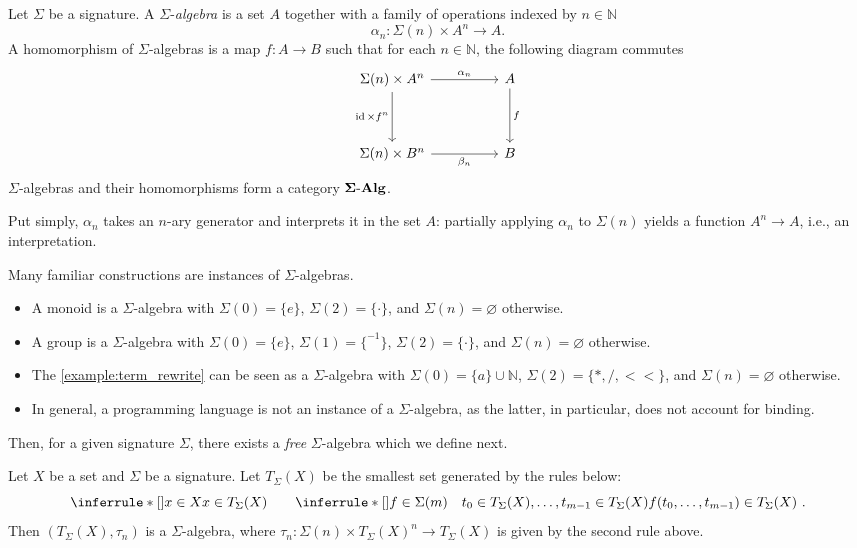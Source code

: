 \begin{definition}\label{def:sigma-alg}
Let $\Sigma$ be a signature.
A $\Sigma$-\emph{algebra} is a set $A$ together with a family of operations indexed by $n \in \mathbb{N}$
\[
\alpha_n : \Sigma(n) \times A^n \to A .
\]
A homomorphism of $\Sigma$-algebras is a map $f : A \to B$ such that for each $n \in \mathbb{N}$, the following diagram commutes
\[\begin{tikzcd}
	{\Sigma(n)\times A^n} && A \\
	\\
	{\Sigma(n)\times B^n} && B
	\arrow["{\alpha_n}", from=1-1, to=1-3]
	\arrow["{\id \times f^n}"', from=1-1, to=3-1]
	\arrow["f", from=1-3, to=3-3]
	\arrow["{\beta_n}"', from=3-1, to=3-3]
\end{tikzcd}\]
$\Sigma$-algebras and their homomorphisms form a category $\mathbf{\Sigma}\text{-}\mathbf{Alg}$.
\end{definition}
Put simply, $\alpha_n$ takes an $n$-ary generator and interprets it in the set $A$: partially applying $\alpha_n$ to $\Sigma(n)$ yields a function $A^n \to A$, i.e., an interpretation.
\begin{example}\label{example:sigma_algebra}
Many familiar constructions are instances of $\Sigma$-algebras.
\begin{itemize}
\item A monoid is a $\Sigma$-algebra with $\Sigma(0) = \{e\}$, $\Sigma(2) = \{\cdot\}$, and $\Sigma(n) = \varnothing$ otherwise.
\item A group is a $\Sigma$-algebra with $\Sigma(0) = \{e\}$, $\Sigma(1) = \{^{-1}\}$, $\Sigma(2) = \{\cdot\}$, and $\Sigma(n) = \varnothing$ otherwise.
\item The \cref{example:term_rewrite} can be seen as a $\Sigma$-algebra with $\Sigma(0) = \{a\} \cup \mathbb{N}$, $\Sigma(2) = \{*, /, <\!\!<\}$, and $\Sigma(n) = \varnothing$ otherwise. 
\item In general, a programming language is not an instance of a $\Sigma$-algebra, as the latter, in particular, does not account for binding.
\end{itemize}
\end{example}
Then, for a given signature $\Sigma$, there exists a \emph{free} $\Sigma$-algebra which we define next.
\begin{definition}\label{def:free_sigma_algebra}
 Let $X$ be a set and $\Sigma$ be a signature.
 Let $T_{\Sigma}(X)$ be the smallest set generated by the rules below:
 \[
 \inferrule*[]{x \in X}{x \in T_{\Sigma}(X)} \qquad \inferrule*[]{f \in \Sigma(m) \quad t_0 \in T_{\Sigma}(X), \ldots, t_{m-1} \in T_{\Sigma}(X)}{f(t_0, \ldots, t_{m-1}) \in T_{\Sigma}(X)}~.
 \] 
 Then $(T_{\Sigma}(X), \tau_n)$ is a $\Sigma$-algebra, where $\tau_n : \Sigma(n) \times T_{\Sigma}(X)^n \to T_{\Sigma}(X)$ is given by the second rule above.
\end{definition}

